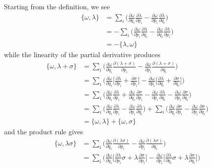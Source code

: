 \documentclass[../principles-of-quantum-mechanics.tex]{subfiles}
\begin{document}
\begin{questions}
		\begin{solution}
			Starting from the definition, we see
			\begin{align*}
				\{\omega, \lambda\} &= \sum_i\Big(\frac{\partial\omega}{\partial q_i}\frac{\partial\lambda}{\partial p_i} - \frac{\partial\omega}{\partial p_i}\frac{\partial\lambda}{\partial q_i}\Big) \\
				&= -\sum_i\Big(\frac{\partial\omega}{\partial p_i}\frac{\partial\lambda}{\partial q_i} - \frac{\partial\omega}{\partial q_i}\frac{\partial\lambda}{\partial p_i}\Big) \\
				&= -\{\lambda, \omega\}
			\end{align*}
			while the linearity of the partial derivative produces
			\begin{align*}
				\{\omega, \lambda + \sigma\} &= \sum_i\Big(\frac{\partial\omega}{\partial q_i}\frac{\partial(\lambda + \sigma)}{\partial p_i} - \frac{\partial\omega}{\partial p_i}\frac{\partial(\lambda + \sigma)}{\partial q_i}\Big) \\
				&= \sum_i\Big(\frac{\partial\omega}{\partial q_i}\Big[\frac{\partial\lambda}{\partial p_i} + \frac{\partial\sigma}{\partial p_i}\Big] - \frac{\partial\omega}{\partial p_i}\Big[\frac{\partial\lambda}{\partial q_i} + \frac{\partial\sigma}{\partial q_i}\Big]\Big) \\
				&= \sum_i\Big(\frac{\partial\omega}{\partial q_i}\frac{\partial\lambda}{\partial p_i} + \frac{\partial\omega}{\partial q_i}\frac{\partial\sigma}{\partial p_i} - \frac{\partial\omega}{\partial p_i}\frac{\partial\lambda}{\partial q_i} - \frac{\partial\omega}{\partial p_i}\frac{\partial\sigma}{\partial q_i}\Big) \\
				&= \sum_i\Big(\frac{\partial\omega}{\partial q_i}\frac{\partial\lambda}{\partial p_i} - \frac{\partial\omega}{\partial p_i}\frac{\partial\lambda}{\partial q_i}\Big) + \sum_i\Big(\frac{\partial\omega}{\partial q_i}\frac{\partial\sigma}{\partial p_i} - \frac{\partial\omega}{\partial p_i}\frac{\partial\sigma}{\partial q_i}\Big) \\
				&= \{\omega, \lambda\} + \{\omega, \sigma\}
			\end{align*}
			and the product rule gives
			\begin{align*}
				\{\omega, \lambda\sigma\} &= \sum_i\Big(\frac{\partial\omega}{\partial q_i}\frac{\partial(\lambda\sigma)}{\partial p_i} - \frac{\partial\omega}{\partial p_i}\frac{\partial(\lambda\sigma)}{\partial q_i}\Big) \\
				&= \sum_i\Big(\frac{\partial\omega}{\partial q_i}\Big[\frac{\partial\lambda}{\partial p_i}\sigma + \lambda\frac{\partial\sigma}{\partial p_i}\Big] - \frac{\partial\omega}{\partial p_i}\Big[\frac{\partial\lambda}{\partial q_i}\sigma + \lambda\frac{\partial\sigma}{\partial q_i}\Big]\Big) \\

\end{align*}
\end{solution}
\end{questions}
\end{document}

